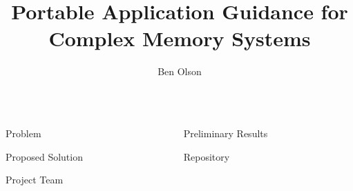 \documentclass[final,hyperref={pdfpagelabels=false}]{beamer}
\title{Portable Application Guidance for Complex Memory Systems}
\author{Ben Olson}
\institute{The University of Tennessee, Knoxville}
\date{}
\begin{document}
\begin{frame}{}
\begin{columns}[t]
  \begin{column}{.45\linewidth}

    \begin{block}{Problem}
    \end{block}
    
    \begin{block}{Proposed Solution}
    \end{block}
    
    \begin{block}{Project Team}
    \end{block}
  \end{column}
  
  \begin{column}{.45\linewidth}

    \begin{block}{Preliminary Results}
    \end{block}
    
    \begin{block}{Repository}
    \end{block}

  \end{column}
\end{columns}
\end{frame}
\end{document}
